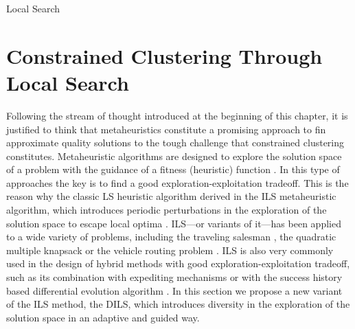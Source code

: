 \begin{algorithm}
	\SetNlSkip{0.5em}
	\BlankLine
	\BlankLine
	
	\caption{Local Search}\label{alg:SHADE_LS}
\end{algorithm}



\section{Constrained Clustering Through Local Search} \label{sec:DILS}


Following the stream of thought introduced at the beginning of this chapter, it is justified to think that metaheuristics constitute a promising approach to fin approximate quality solutions to the tough challenge that constrained clustering constitutes. Metaheuristic algorithms are designed to explore the solution space of a problem with the guidance of a fitness (heuristic) function \cite{Gendreau:2010:HM:1941310}. In this type of approaches the key is to find a good exploration-exploitation tradeoff. This is the reason why the classic \acf{LS} heuristic algorithm derived in the \acf{ILS} metaheuristic algorithm, which introduces periodic perturbations in the exploration of the solution space to escape local optima \cite{lourencco2010iterated}. \acs{ILS}---or variants of it---has been applied to a wide variety of problems, including the traveling salesman \cite{archetti2018iterated}, the quadratic multiple knapsack \cite{avci2017multi} or the vehicle routing problem \cite{chentli2018impact, estrada2019biased}. \acs{ILS} is also very commonly used in the design of hybrid methods with good exploration-exploitation tradeoff, such as its combination with expediting mechanisms \cite{zohali2019reformulation} or with the success history based differential evolution algorithm \cite{zhao2019hybrid}. In this section we propose a new variant of the \acs{ILS} method, the \acs{DILS}, which introduces diversity in the exploration of the solution space in an adaptive and guided way.


